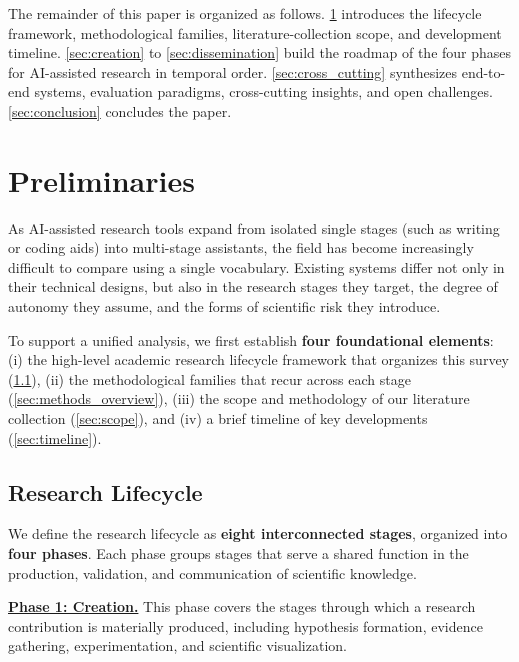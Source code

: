 \documentclass{llmxive}
\begin{document}
The remainder of this paper is organized as follows. \cref{sec:preliminaries} introduces the lifecycle framework, methodological families, literature-collection scope, and development timeline. \cref{sec:creation} to \cref{sec:dissemination} build the roadmap of the four phases for AI-assisted research in temporal order. \cref{sec:cross_cutting} synthesizes end-to-end systems, evaluation paradigms, cross-cutting insights, and open challenges. \cref{sec:conclusion} concludes the paper.






\section{Preliminaries}
\label{sec:preliminaries}

As AI-assisted research tools expand from isolated single stages (such as writing or coding aids) into multi-stage assistants, the field has become increasingly difficult to compare using a single vocabulary. Existing systems differ not only in their technical designs, but also in the research stages they target, the degree of autonomy they assume, and the forms of scientific risk they introduce. 

To support a unified analysis, we first establish \textbf{four foundational elements}: (i) the high-level academic research lifecycle framework that organizes this survey (\cref{sec:lifecycle}), (ii) the methodological families that recur across each stage (\cref{sec:methods_overview}), (iii) the scope and methodology of our literature collection (\cref{sec:scope}), and (iv) a brief timeline of key developments (\cref{sec:timeline}).



\subsection{Research Lifecycle}
\label{sec:lifecycle}

We define the research lifecycle as \textbf{eight interconnected stages}, organized into \textbf{four phases}. Each phase groups stages that serve a shared function in the production, validation, and communication of scientific knowledge.

\vspace{6pt}
\noindent\underline{\textbf{Phase 1: Creation.}} This phase covers the stages through which a research contribution is materially produced, including hypothesis formation, evidence gathering, experimentation, and scientific visualization.
\end{document}
